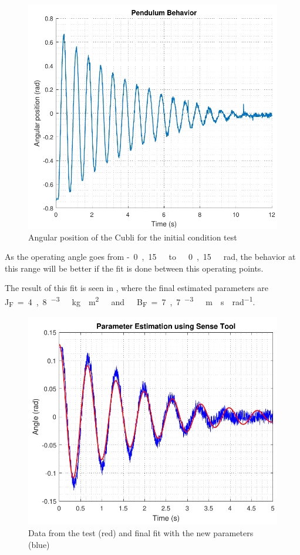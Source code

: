 \begin{figure}[H]
	\centering
	\includegraphics[scale=0.6]{figures/PendRad}
	\caption{Angular position of the Cubli for the initial condition test}
	\label{cubliInitCondTest}
\end{figure}

As the operating angle goes from \si{-0,15\ to\ 0,15\ rad}, the behavior at this range will be better if the fit is done between this operating points.

The result of this fit is seen in , where the final estimated parameters are \si{J_F=4,8 ^{-3}\ kg \cdot m^2\ and\ B_F=7,7 ^{-3}\ m \cdot s \cdot rad^{-1}}.

\begin{figure}[H]
	\centering
	\includegraphics[scale=0.6]{figures/SenseToolParameterEstimation}
	\caption{Data from the test (red) and final fit with the new parameters (blue)}
	\label{SenseToolParameterEstimation}
\end{figure}

